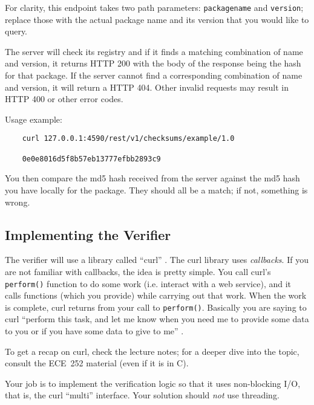 \documentclass[12pt]{article}
\renewcommand{\_}{\kern-1.5pt\textunderscore\kern-1.5pt}
\begin{document}
For clarity, this endpoint takes two path parameters: \texttt{package\_name} and \texttt{version}; replace those with the actual package name and its version that you would like to query.\par

\vspace{1em}
The server will check its registry and if it finds a matching combination of name and version, it returns HTTP 200 with the body of the response being the hash for that package. If the server cannot find a corresponding combination of name and version, it will return a HTTP 404. Other invalid requests may result in HTTP 400 or other error codes. \par

\vspace{1em}
Usage example:

\begin{verbatim}
    curl 127.0.0.1:4590/rest/v1/checksums/example/1.0

    0e0e8016d5f8b57eb13777efbb2893c9
\end{verbatim}

You then compare the md5 hash received from the server against the md5 hash you have locally for the package. They should all be a match; if not, something is wrong.

\subsection*{Implementing the Verifier}

\vspace{1em}
The verifier will use a library called ``curl'' . The curl library uses \textit{callbacks}. If you are not familiar with callbacks, the idea is pretty simple. You call curl's \texttt{perform()} function to do some work (i.e. interact with a web service), and it calls functions (which you provide) while carrying out that work. When the work is complete, curl returns from your call to \texttt{perform()}. Basically you are saying to curl ``perform this task, and let me know when you need me to provide some data to you or if you have some data to give to me'' .\par

\vspace{1em}
To get a recap on curl, check the lecture notes; for a deeper dive into the topic, consult the ECE~252 material (even if it is in C).\par

\vspace{1em}
Your job is to implement the verification logic so that it uses non-blocking I/O, that is, the curl ``multi'' interface. Your solution should \textit{not} use threading.  \par
\end{document}
